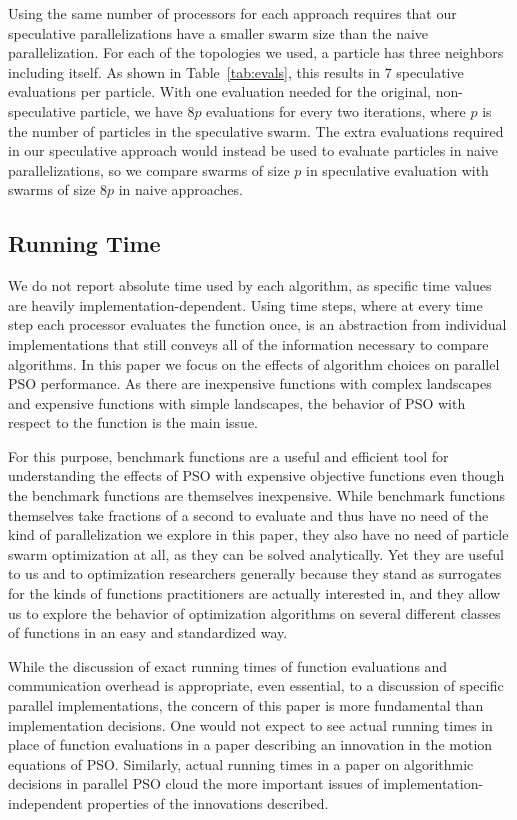 \documentclass[smallcondensed]{svjour3}
\begin{document}
Using the same number of processors for each approach requires that our
speculative parallelizations have a smaller swarm size than the naive
parallelization.  For each of the topologies we used, a particle has three
neighbors including itself.  As shown in Table~\ref{tab:evals}, this results in
$7$ speculative evaluations per particle.  With one evaluation needed for the
original, non-speculative particle, we have $8p$ evaluations for every two
iterations, where $p$ is the number of particles in the speculative swarm.  The
extra evaluations required in our speculative approach would instead be used to
evaluate particles in naive parallelizations, so we compare swarms of size
$p$ in speculative evaluation with swarms of size $8p$ in naive approaches.

\subsection{Running Time}

We do not report absolute time used by each algorithm, as specific time values
are heavily implementation-dependent.  Using time steps, where at every time
step each processor evaluates the function once, is an abstraction from
individual implementations that still conveys all of the information necessary
to compare algorithms.  In this paper we focus on the effects of algorithm
choices on parallel PSO performance.  As there are inexpensive functions with
complex landscapes and expensive functions with simple landscapes, the behavior
of PSO with respect to the function is the main issue.

For this purpose, benchmark functions are a useful and efficient tool for
understanding the effects of PSO with expensive objective functions even though
the benchmark functions are themselves inexpensive.  While benchmark functions
themselves take fractions of a second to evaluate and thus have no need of the
kind of parallelization we explore in this paper, they also have no need of
particle swarm optimization at all, as they can be solved analytically.  Yet
they are useful to us and to optimization researchers generally because they
stand as surrogates for the kinds of functions practitioners are actually
interested in, and they allow us to explore the behavior of optimization
algorithms on several different classes of functions in an easy and
standardized way.

While the discussion of exact running times of function evaluations and
communication overhead is appropriate, even essential, to a discussion of
specific parallel implementations, the concern of this paper is more
fundamental than implementation decisions.  One would not expect to see actual
running times in place of function evaluations in a paper describing an
innovation in the motion equations of PSO.  Similarly, actual running times in
a paper on algorithmic decisions in parallel PSO cloud the more important
issues of implementation-independent properties of the innovations described.
\end{document}
